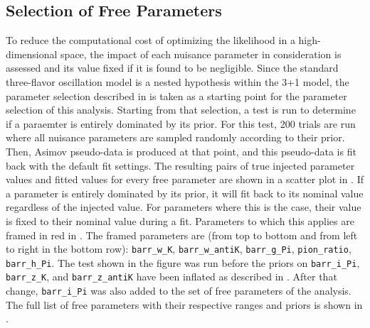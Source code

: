 \subsection{Selection of Free Parameters}
\label{sec:sterile-analysis-parameter-selection}
To reduce the computational cost of optimizing the likelihood in a high-dimensional space, the impact of each nuisance parameter in consideration is assessed and its value fixed if it is found to be negligible.
Since the standard three-flavor oscillation model is a nested hypothesis within the 3+1 model, the parameter selection described in  is taken as a starting point for the parameter selection of this analysis.
Starting from that selection, a test is run to determine if a paraemter is entirely dominated by its prior.
For this test, 200 trials are run where all nuisance parameters are sampled randomly according to their prior.
Then,  Asimov pseudo-data is produced at that point, and this pseudo-data is fit back with the default fit settings.
The resulting pairs of true injected parameter values and fitted values for every free parameter are shown in a scatter plot in .
If a parameter is entirely dominated by its prior, it will fit back to its nominal value regardless of the injected value.
For parameters where this is the case, their value is fixed to their nominal value during a fit.
Parameters to which this applies are framed in red in .
The framed parameters are (from top to bottom and from left to right in the bottom row): \texttt{barr\_w\_K}, \texttt{barr\_w\_antiK}, \texttt{barr\_g\_Pi}, \texttt{pion\_ratio}, \texttt{barr\_h\_Pi}.
The test shown in the figure was run before the priors on \texttt{barr\_i\_Pi}, \texttt{barr\_z\_K}, and \texttt{barr\_z\_antiK} have been inflated as described in .
After that change,  \texttt{barr\_i\_Pi} was also added to the set of free parameters of the analysis.
The full list of free parameters with their respective ranges and priors is shown in .

